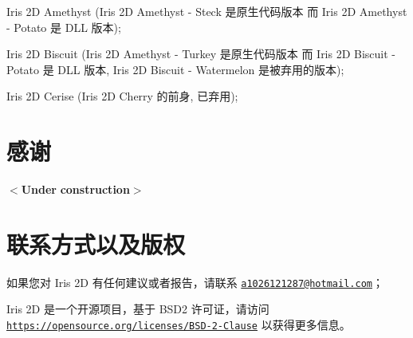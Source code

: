 \begin{DoxyItemize}
\item Iris 2D Amethyst (Iris 2D Amethyst -\/ Steck 是原生代码版本 而 Iris 2D Amethyst -\/ Potato 是 D\+LL 版本); \item Iris 2D Biscuit (Iris 2D Amethyst -\/ Turkey 是原生代码版本 而 Iris 2D Biscuit -\/ Potato 是 D\+LL 版本, Iris 2D Biscuit -\/ Watermelon 是被弃用的版本); \item Iris 2D Cerise (Iris 2D Cherry 的前身, 已弃用);\end{DoxyItemize}
\hypertarget{index_thanks}{}\section{感谢}\label{index_thanks}
\begin{DoxyParagraph}{}
$<${\bfseries Under} {\bfseries construction$>$} 
\end{DoxyParagraph}
\hypertarget{index_cont_cprt}{}\section{联系方式以及版权}\label{index_cont_cprt}
\begin{DoxyParagraph}{}
如果您对 Iris 2D 有任何建议或者报告，请联系 \href{mailto:a1026121287@hotmail.com}{\tt a1026121287@hotmail.\+com}； 
\end{DoxyParagraph}
\begin{DoxyParagraph}{}
Iris 2D 是一个开源项目，基于 B\+S\+D2 许可证，请访问 \href{https://opensource.org/licenses/BSD-2-Clause}{\tt https\+://opensource.\+org/licenses/\+B\+S\+D-\/2-\/\+Clause} 以获得更多信息。 
\end{DoxyParagraph}
